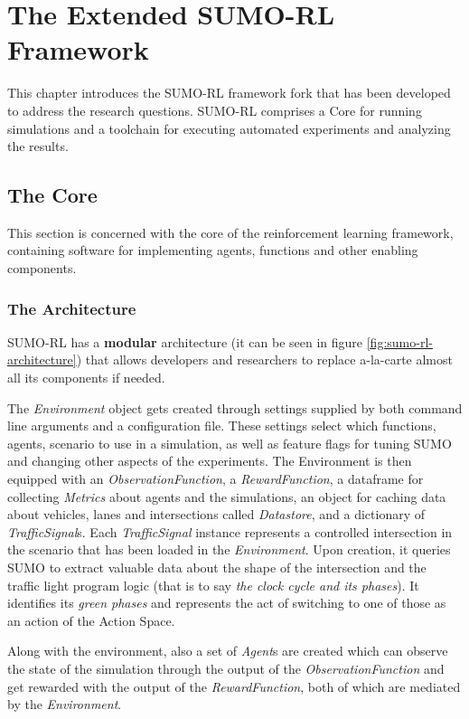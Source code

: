 \chapter{The Extended SUMO-RL Framework}

This chapter introduces the SUMO-RL framework fork that has been developed to address the research questions.
SUMO-RL comprises a Core for running simulations and a toolchain for executing automated experiments and analyzing the results.

\section{The Core}

This section is concerned with the core of the reinforcement learning framework, containing software for implementing agents, functions and other enabling components.

\subsection{The Architecture}

SUMO-RL has a \textbf{modular} architecture (it can be seen in figure \ref{fig:sumo-rl-architecture}) that allows developers and researchers to replace a-la-carte almost all its components if needed.

The \textit{Environment} object gets created through settings supplied by both command line arguments and a configuration file.
These settings select which functions, agents, scenario to use in a simulation, as well as feature flags for tuning SUMO and changing other aspects of the experiments.
The Environment is then equipped with an \textit{ObservationFunction}, a \textit{RewardFunction}, a dataframe for collecting \textit{Metrics} about agents and the simulations, an object for caching data about vehicles, lanes and intersections called \textit{Datastore}, and a dictionary of \textit{TrafficSignal}s.
Each \textit{TrafficSignal} instance represents a controlled intersection in the scenario that has been loaded in the \textit{Environment}. Upon creation, it queries SUMO to extract valuable data about the shape of the intersection and the traffic light program logic (that is to say \textit{the clock cycle and its phases}). It identifies its \textit{green phases} and represents the act of switching to one of those as an action of the Action Space.

Along with the environment, also a set of \textit{Agent}s are created which can observe the state of the simulation through the output of the \textit{ObservationFunction} and get rewarded with the output of the \textit{RewardFunction}, both of which are mediated by the \textit{Environment}.


